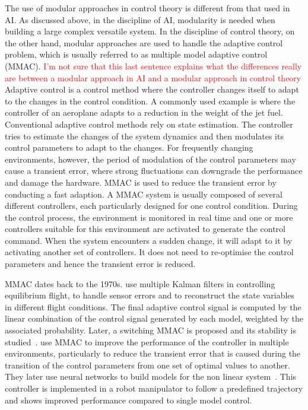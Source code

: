The use of modular approaches in control theory is different from that used in AI. As discussed above, in the discipline of AI, modularity is needed when building a large complex versatile system. In the discipline of control theory, on the other hand, modular approaches are used to handle the adaptive control problem, which is usually referred to as multiple model adaptive control (MMAC).
\textcolor{red}{I'm not sure that this last sentence explains what the differences really are between a modular approach in AI and a modular approach in control theory}
Adaptive control is a control method where the controller changes itself to adapt to the changes in the control condition.
A commonly used example is where the controller of an aeroplane adapts to a reduction in the weight of the jet fuel.
Conventional adaptive control methods rely on state estimation. The controller tries to estimate the changes of the system dynamics and then modulates its control parameters to adapt to the changes. For frequently changing environments, however, the period of modulation of the control parameters may cause a transient error, where strong fluctuations can downgrade the performance and damage the hardware. MMAC is used to reduce the transient error by conducting a fast adaption. A MMAC system is usually composed of several different controllers, each particularly designed for one control condition. During the control process, the environment is monitored in real time and one or more controllers suitable for this environment are activated to generate the control command. When the system encounters a sudden change, it will adapt to it by activating another set of controllers. It does not need to re-optimise the control parameters and hence the transient error is reduced.

MMAC dates back to the 1970s. \citet{athans1977stochastic} use multiple Kalman filters in controlling equilibrium flight, to handle sensor errors and to reconstruct the state variables in different flight conditions. The final adaptive control signal is computed by the linear combination of the control signal generated by each model, weighted by the associated probability. Later, a switching MMAC is proposed and its stability is studied~\citep{fu1986adaptive}.
\citet{narendra1994improving} use MMAC to improve the performance of the controller in multiple environments, particularly to reduce the transient error that is caused during the transition of the control parameters from one set of optimal values to another. They later use neural networks to build models for the non linear system~\citep{narendra1995adaptation,narendra1997adaptive}. This controller is implemented in a robot manipulator to follow a predefined trajectory and shows improved performance compared to single model control.

